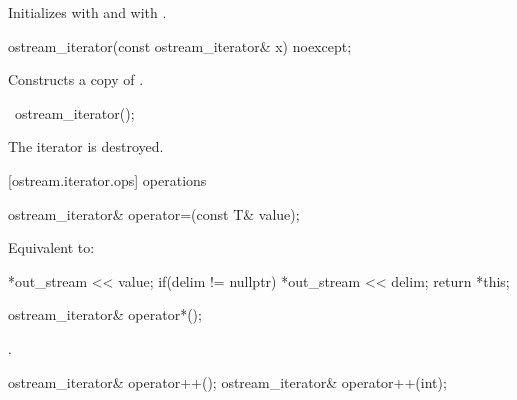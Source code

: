 \begin{itemdescr}
\pnum
\effects
Initializes  with  and  with .
\end{itemdescr}

%
\begin{itemdecl}
ostream_iterator(const ostream_iterator& x) noexcept;
\end{itemdecl}

\begin{itemdescr}
\pnum
\effects
Constructs a copy of .
\end{itemdescr}

%
\begin{itemdecl}
~ostream_iterator();
\end{itemdecl}

\begin{itemdescr}
\pnum
\effects
The iterator is destroyed.
\end{itemdescr}

[ostream.iterator.ops]{ operations}

%
%
\begin{itemdecl}
ostream_iterator& operator=(const T& value);
\end{itemdecl}

\begin{itemdescr}
\pnum
\effects Equivalent to:
\begin{codeblock}
*out_stream << value;
if(delim != nullptr)
  *out_stream << delim;
return *this;
\end{codeblock}
\end{itemdescr}

%
%
\begin{itemdecl}
ostream_iterator& operator*();
\end{itemdecl}

\begin{itemdescr}
\pnum
\returns
{}.
\end{itemdescr}

%
%
\begin{itemdecl}
ostream_iterator& operator++();
ostream_iterator& operator++(int);
\end{itemdecl}

